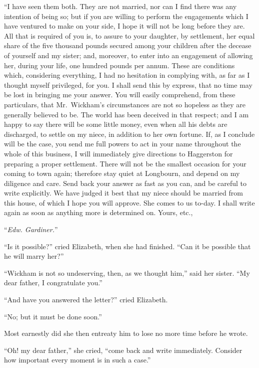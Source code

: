 \bigskip
``I have seen them both.  They are not married, nor can I find
there was any intention of being so; but if you are willing to
perform the engagements which I have ventured to make on your
side, I hope it will not be long before they are.  All that is
required of you is, to assure to your daughter, by settlement,
her equal share of the five thousand pounds secured among your
children after the decease of yourself and my sister; and,
moreover, to enter into an engagement of allowing her, during
your life, one hundred pounds per annum.  These are conditions
which, considering everything, I had no hesitation in complying
with, as far as I thought myself privileged, for you.  I shall
send this by express, that no time may be lost in bringing me
your answer.  You will easily comprehend, from these particulars,
that Mr.\ Wickham's circumstances are not so hopeless as they
are generally believed to be.  The world has been deceived in
that respect; and I am happy to say there will be some little
money, even when all his debts are discharged, to settle on my
niece, in addition to her own fortune.  If, as I conclude will
be the case, you send me full powers to act in your name
throughout the whole of this business, I will immediately give
directions to Haggerston for preparing a proper settlement.
There will not be the smallest occasion for your coming to town
again; therefore stay quiet at Longbourn, and depend on my
diligence and care.  Send back your answer as fast as you can,
and be careful to write explicitly.  We have judged it best that
my niece should be married from this house, of which I hope
you will approve.  She comes to us to-day.  I shall write again
as soon as anything more is determined on.  Yours, etc.,

\medskip
``\emph{Edw. Gardiner.}''
\bigskip

``Is it possible?'' cried Elizabeth, when she had finished.  ``Can it
be possible that he will marry her?''

``Wickham is not so undeserving, then, as we thought him,'' said
her sister.  ``My dear father, I congratulate you.''

``And have you answered the letter?'' cried Elizabeth.

``No; but it must be done soon.''

Most earnestly did she then entreaty him to lose no more time
before he wrote.

``Oh! my dear father,'' she cried, ``come back and write immediately.
Consider how important every moment is in such a case.''

